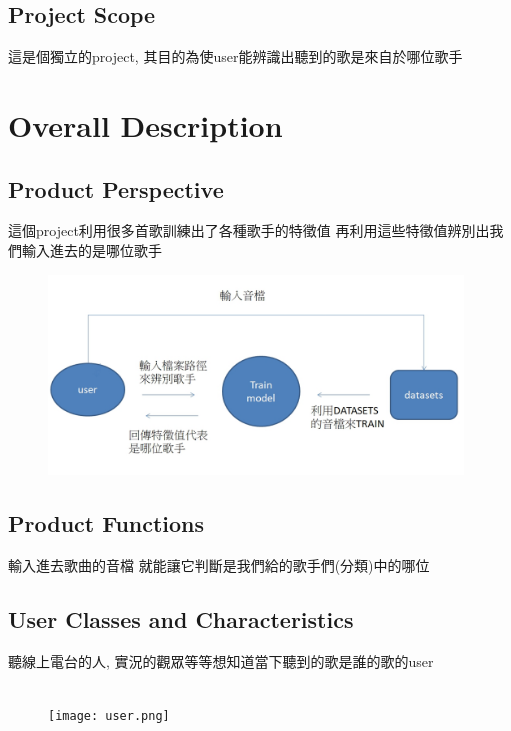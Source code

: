 \documentclass{article}
\begin{document}
\begin{CJK}{UTF8}{bkai}
\subsection{Project Scope\\}
這是個獨立的project, 
其目的為使user能辨識出聽到的歌是來自於哪位歌手

\newpage


\section{\huge\bf \color{blue}  Overall Description\\}

\subsection{\Large Product Perspective\\}
 \large 這個project利用很多首歌訓練出了各種歌手的特徵值 再利用這些特徵值辨別出我們輸入進去的是哪位歌手\\
\begin{figure}[h]
\begin{center}
\includegraphics[width=11cm]{product_persp.jpg}
\end{center}
\label{fig:2}
\end{figure}
\subsection{\Large Product Functions}
\large 輸入進去歌曲的音檔 就能讓它判斷是我們給的歌手們(分類)中的哪位\\

\subsection{\Large User Classes and Characteristics\\}
  \Large 聽線上電台的人, 實況的觀眾等等想知道當下聽到的歌是誰的歌的user\\\\%
\begin{figure}[h]
\begin{center}
\texttt{[image: user.png]}
\end{center}
\label{fig:3}
\end{figure}
\newpage

\end{CJK}
\end{document}
